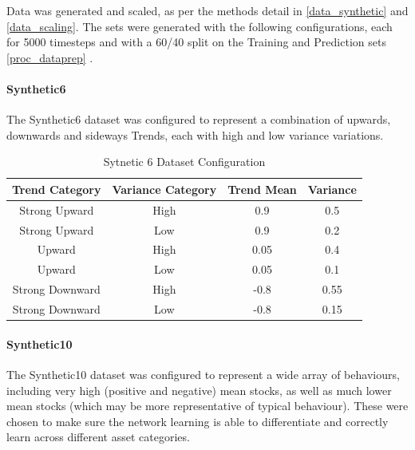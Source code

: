 \documentclass[a4paper,latin]{paper}
\begin{document}
Data was generated and scaled, as per the methods detail in \ref{data_synthetic} and \ref{data_scaling}. The sets were generated with the following configurations, each for 5000 timesteps and with a 60/40 split on the Training and Prediction sets \ref{proc_dataprep} .

\paragraph{Synthetic6} \label{dataset_synthetic6}

The Synthetic6 dataset was configured to represent a combination of upwards, downwards and sideways Trends, each with high and low variance variations.

	\begin{table}[h]
		\centering
		\begin{tabular}{|c|c|c|c|}
			\hline
			\textbf{Trend Category} &\textbf{Variance Category} & \textbf{Trend Mean} & \textbf{Variance}\\\hline	
			{Strong Upward} & {High} & {0.9} & {0.5} \\\hline
			{Strong Upward} & {Low} & {0.9} & {0.2} \\\hline
			{Upward} & {High} & {0.05} & {0.4} \\\hline
			{Upward} & {Low} & {0.05} & {0.1} \\\hline
			{Strong Downward} & {High} & {-0.8} & {0.55} \\\hline
			{Strong Downward} & {Low} & {-0.8} & {0.15} \\\hline
		\end{tabular}
		\newline\newline
		\caption{Sytnetic 6 Dataset Configuration}\label{tab_synth6}
	\end{table}

\paragraph{Synthetic10}\label{dataset_synthetic10}

The Synthetic10 dataset was configured to represent a wide array of behaviours, including very high (positive and negative) mean stocks, as well as much lower mean stocks (which may be more representative of typical behaviour). These were chosen to make sure the network learning is able to differentiate and correctly learn across different asset categories.
\end{document}
